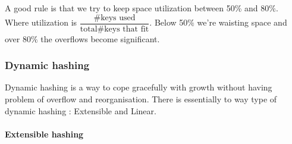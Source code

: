 \documentclass[12pt,a4paper]{article}
\begin{document}
A good rule is that we try to keep space utilization between 50\% and 80$\%$. Where utilization is $\dfrac{\# \text{keys used}}{\text{total} \# \text{keys that fit}}$. Below 50$\%$ we're waisting space and over 80$\%$ the overflows become significant.

\subsubsection{Dynamic hashing}
Dynamic hashing is a way to cope gracefully with growth without having problem of overflow and reorganisation. There is essentially to way type of dynamic hashing : Extensible and Linear.

\paragraph{Extensible hashing}
\end{document}

